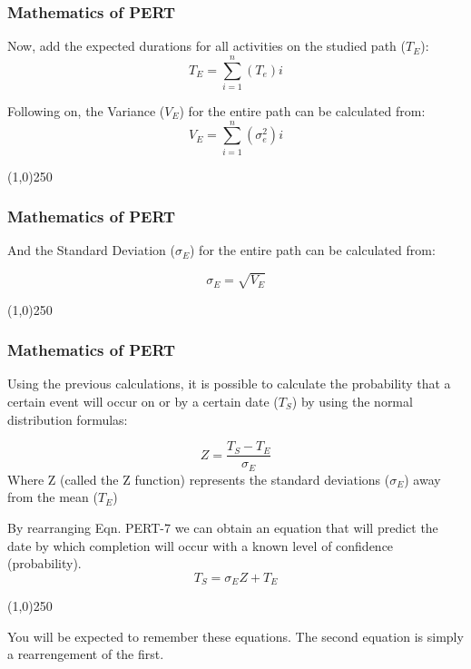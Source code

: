 \begin{frame}
\frametitle{Mathematics of PERT}
Now, add the expected durations for all activities on the studied path ($T_E$):\\
\begin{equation}
T_{E} = \sum\limits_{i=1}^{n}(T_{e})i \label{eqn:sumTe} \tag{PERT-4}
\end{equation}

Following on, the Variance ($V_E$) for the entire path can be calculated from:\\
\begin{equation}
V_E = \sum\limits_{i=1}^{n}(\sigma_{e}^{2})i \label{eqn:sumSD} \tag{PERT-5}
\end{equation}
\end{frame}
\begin{center}\line(1,0){250}\end{center}



\begin{frame}
\frametitle{Mathematics of PERT}
And the Standard Deviation ($\sigma_E$) for the entire path can be calculated from:


\begin{equation}
\sigma_E =\sqrt{V_E} \label{eqn:rootvar} \tag{PERT-6}
\end{equation}


\end{frame}
\begin{center}\line(1,0){250}\end{center}



\begin{frame}
\frametitle{Mathematics of PERT}
Using the previous calculations, it is possible to calculate the probability that a certain event will occur on or by a certain date ($T_S$) by using the normal distribution formulas:


\begin{equation}
Z =\frac{T_{S}-T_{E}}{\sigma_E} \label{eqn:zeqn} \tag{PERT-7}
\end{equation}
Where Z (called the Z function) represents the standard deviations ($\sigma_E$) away from the mean ($T_E$)

By rearranging Eqn. PERT-7 we can obtain an equation that will predict the date by which completion will occur with a known level of confidence (probability). \\
\begin{equation}
T_{S} =\sigma_{E}Z+T_{E} \label{eqn:zflat} \tag{PERT-8}
\end{equation}


\end{frame}
\begin{center}\line(1,0){250}\end{center}
You will be expected to remember these equations.  The second equation is simply a rearrengement of the first.

